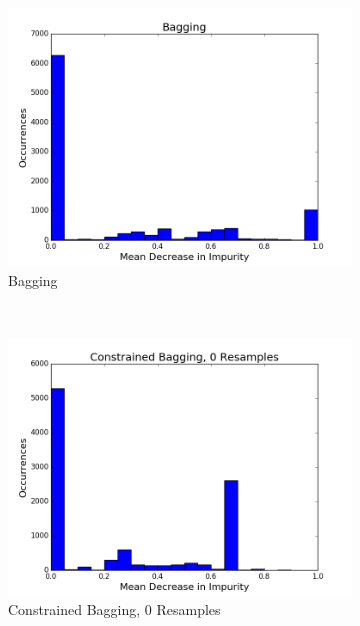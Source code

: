\begin{figure}[H]
  \centering
  \begin{subfigure}[b]{0.45\textwidth}
    \includegraphics[width=\textwidth]{figures/random_forests/bagging_bias_bagging_hist.png}
    \caption{Bagging}
    \label{fig:bagging-bias-bagging}
  \end{subfigure}
  ~
  \begin{subfigure}[b]{0.45\textwidth}
    \includegraphics[width=\textwidth]{figures/random_forests/bagging_bias_no_bagging_hist.png}
    \caption{Constrained Bagging, 0 Resamples}
    \label{fig:bagging-bias-constrained-0}
  \end{subfigure}
  ~
  \begin{subfigure}[b]{0.45\textwidth}

\end{subfigure}
\end{figure}
